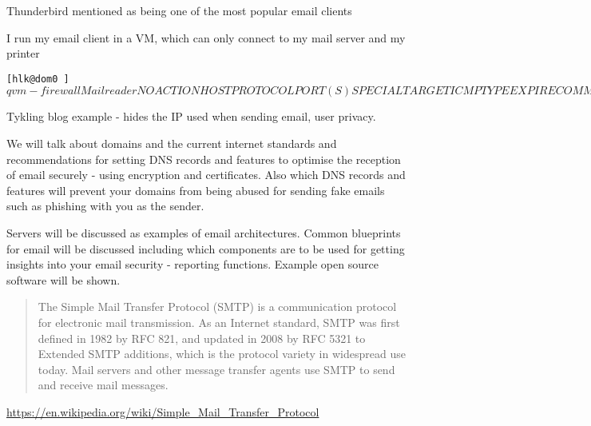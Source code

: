 \documentclass[Screen16to9,17pt]{foils}
\begin{document}
Thunderbird mentioned as being one of the most popular email clients



I run my email client in a VM, which can only connect to my mail server and my printer

\begin{alltt}\footnotesize
[hlk@dom0 ~]$ qvm-firewall Mailreader
NO  ACTION  HOST             PROTOCOL  PORT(S)  SPECIAL TARGET  ICMP TYPE  EXPIRE  COMMENT
0   accept  91.102.91.22/32  tcp       993      -               -          -       -
1   accept  91.102.91.22/32  tcp       587      -               -          -       -
2   accept  10.0.42.13/32    tcp       515      -               -          -       -
3   drop    -                -         -        -               -          -       -
[hlk@dom0 ~]$
\end{alltt}


Tykling blog example - hides the IP used when sending email, user privacy.


We will talk about domains and the current internet standards and recommendations for setting DNS records and features to optimise the reception of email securely - using encryption and certificates. Also which DNS records and features will prevent your domains from being abused for sending fake emails such as phishing with you as the sender.

Servers will be discussed as examples of email architectures. Common blueprints for email will be discussed including which components are to be used for getting insights into your email security - reporting functions. Example open source software will be shown.


\begin{quote}
  The Simple Mail Transfer Protocol (SMTP) is a communication protocol for electronic mail transmission. As an Internet standard, SMTP was first defined in 1982 by RFC 821, and updated in 2008 by RFC 5321 to Extended SMTP additions, which is the protocol variety in widespread use today. Mail servers and other message transfer agents use SMTP to send and receive mail messages.
\end{quote}

\url{https://en.wikipedia.org/wiki/Simple_Mail_Transfer_Protocol}
\end{document}
